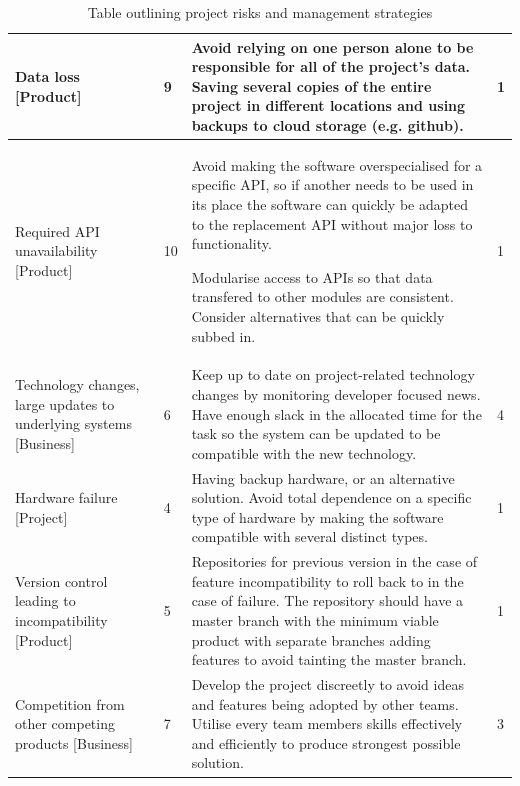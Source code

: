 \documentclass[]{IEEEtran}
\begin{document}
\begin{table}[h]
\begin{tabular}{| m{4cm} | m{1cm} | m{9.5cm} | m{1.5cm} | }
		\hline
		
		Data loss [Product] & 
		9 &
		Avoid relying on one person alone to be responsible for all of the project's data. Saving several copies of the entire project in different locations and using backups to cloud storage (e.g. github). & 
		1 \\
		
		\hline
		
		Required API unavailability [Product] & 
		10 & 
		Avoid making the software overspecialised for a specific API, so if another needs to be used in its place the software can quickly be adapted to the replacement API without major loss to functionality. 
		
	Modularise access to APIs so that data transfered to other modules are consistent. Consider alternatives that can be quickly subbed in. & 
		1 \\
		
		\hline 
		
		Technology changes, large updates to underlying systems [Business] & 
		6 & 
		Keep up to date on project-related technology changes by monitoring developer focused news. Have enough slack in the allocated time for the task so the system can be updated to be compatible with the new technology. & 
		4 \\
		
		\hline
		
		Hardware failure [Project] & 
		4 & 
		Having backup hardware, or an alternative solution. Avoid total dependence on a specific type of hardware by making the software compatible with several distinct types. &
		1 \\
		
		\hline
		
		Version control leading to incompatibility [Product] & 
		5 & 
		Repositories for previous version in the case of feature incompatibility to roll back to in the case of failure. The repository should have a master branch with the minimum viable product with separate branches adding features to avoid tainting the master branch. & 
		1 \\
		
		\hline
		
		Competition from other competing products [Business] & 
		7 & 
		Develop the project discreetly to avoid ideas and features being adopted by other teams. Utilise every team members skills effectively and efficiently to produce strongest possible solution. & 
		3 \\
		
		\hline
		
	\end{tabular}
	\caption{Table outlining project risks and management strategies}
\end{table}
	
\end{document}
